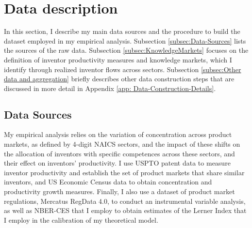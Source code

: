 
\section{Data description\label{sec:Data-description}}

In this section, I describe my main data sources and the procedure
to build the dataset employed in my empirical analysis. Subsection
\ref{subsec:Data-Sources} lists the sources of the raw data. Subsection
\ref{subsec:KnowledgeMarkets} focuses on the definition of inventor
productivity measures and knowledge markets, which I identify through
realized inventor flows across sectors. Subsection \ref{subsec:Other data and aggregation}
briefly describes other data construction steps that are discussed
in more detail in Appendix \ref{app: Data-Construction-Details}. 

\subsection{Data Sources\label{subsec:Data-Sources}}

My empirical analysis relies on the variation of concentration across
product markets, as defined by 4-digit NAICS sectors, and the impact
of these shifts on the allocation of inventors with specific competences
across these sectors, and their effect on inventors' productivity.
I use USPTO patent data to measure inventor productivity and establish
the set of product markets that share similar inventors, and US Economic
Census data to obtain concentration and productivity growth measures.
Finally, I also use a dataset of product market regulations, Mercatus
RegData 4.0, to conduct an instrumental variable analysis, as well
as NBER-CES that I employ to obtain estimates of the Lerner Index
that I employ in the calibration of my theoretical model. 

